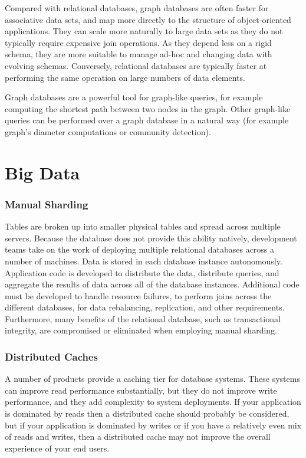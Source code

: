 \documentclass[12pt]{article}
\begin{document}
Compared with relational databases, graph databases are often faster for associative data sets, and map more directly to the structure of object-oriented applications. They can scale more naturally to large data sets as they do not typically require expensive join operations. As they depend less on a rigid schema, they are more suitable to manage ad-hoc and changing data with evolving schemas. Conversely, relational databases are typically faster at performing the same operation on large numbers of data elements.

Graph databases are a powerful tool for graph-like queries, for example computing the shortest path between two nodes in the graph. Other graph-like queries can be performed over a graph database in a natural way (for example graph's diameter computations or community detection).


\section{Big Data}




\subsubsection{Manual Sharding}

Tables are broken up into smaller physical tables and spread across multiple servers. Because the database does not provide this ability natively, development teams take on the work of deploying multiple relational databases across a number of machines. Data is stored in each database instance autonomously. Application code is developed to distribute the data, distribute queries, and aggregate the results of data across all of the database instances. Additional code must be developed to handle resource failures, to perform joins across the different databases, for data rebalancing, replication, and other requirements. Furthermore, many benefits of the relational database, such as transactional integrity, are compromised or eliminated when employing manual sharding.





\subsubsection{Distributed Caches}

A number of products provide a caching tier for database systems. These systems can improve read performance substantially, but they do not improve write performance, and they add complexity to system deployments. If your application is dominated by reads then a distributed cache should probably be considered, but if your application is dominated by writes or if you have a relatively even mix of reads and writes, then a distributed cache may not improve the overall experience of your end users.
\end{document}

